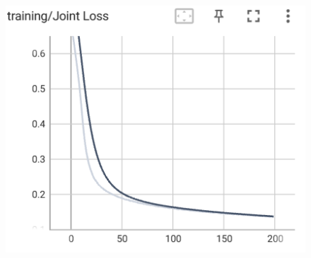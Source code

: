 \documentclass[12pt]{article}
\begin{document}
\begin{enumerate}
\begin{figure}[htbp]
	\begin{minipage}{0.4\linewidth}
		\centering
		\includegraphics[width=0.9\linewidth]{./figs/shared_joint_loss_50_50.png}
		\label{pic three}%
	\end{minipage}
    \end{figure}


\end{enumerate}
\end{document}
